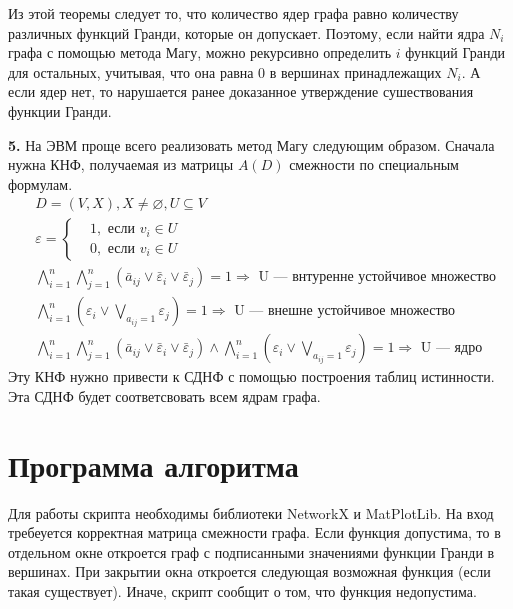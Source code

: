 \documentclass[12pt, letterpaper, titlepage]{article}
\let\emptyset\varnothing
\begin{document}
Из этой теоремы следует то, что количество ядер графа равно количеству различных функций Гранди, которые он допускает.
Поэтому, если найти ядра $N_i$ графа с помощью метода Магу, можно рекурсивно определить $i$ функций Гранди для остальных, учитывая, что
она равна 0 в вершинах принадлежащих $N_i$. А если ядер нет, то нарушается ранее доказанное утверждение сушествования функции Гранди.

\textbf{5. }На ЭВМ проще всего реализовать метод Магу следующим образом. Сначала нужна КНФ, получаемая из матрицы $A(D)$ смежности по специальным формулам.
\[
    \begin{split}
        &D = (V,X), X \neq \emptyset, U \subseteq V\\
        &\varepsilon = 
        \begin{cases}
            &1, \text{ если } v_i \in U\\
            &0, \text{ если } v_i \in U
        \end{cases}\\
        &\bigwedge_{i=1}^{n}\bigwedge_{j=1}^{n}(\bar a_{ij} \vee \bar \varepsilon_i \vee \bar \varepsilon_j) = 1 \Rightarrow \text{ U --- внтуренне устойчивое множество}\\
        &\bigwedge_{i=1}^{n}(\varepsilon_i \vee \bigvee_{a_{ij}=1} \varepsilon_j) = 1 \Rightarrow \text{ U --- внешне устойчивое множество}\\
        &\bigwedge_{i=1}^{n}\bigwedge_{j=1}^{n}(\bar a_{ij} \vee \bar \varepsilon_i \vee \bar \varepsilon_j) \wedge \bigwedge_{i=1}^{n}(\varepsilon_i \vee \bigvee_{a_{ij}=1} \varepsilon_j) = 1 \Rightarrow \text{ U --- ядро}
    \end{split}
\]
Эту КНФ нужно привести к СДНФ с помощью построения таблиц истинности. Эта СДНФ будет соответсвовать всем ядрам графа.
\section{Программа алгоритма}
Для работы скрипта необходимы библиотеки NetworkX и MatPlotLib. На вход требеуется корректная матрица смежности графа.
Если функция допустима, то в отдельном окне откроется граф с подписанными значениями функции Гранди в вершинах. При закрытии окна откроется следующая возможная функция (если такая существует).
Иначе, скрипт сообщит о том, что функция недопустима.

\end{document}
